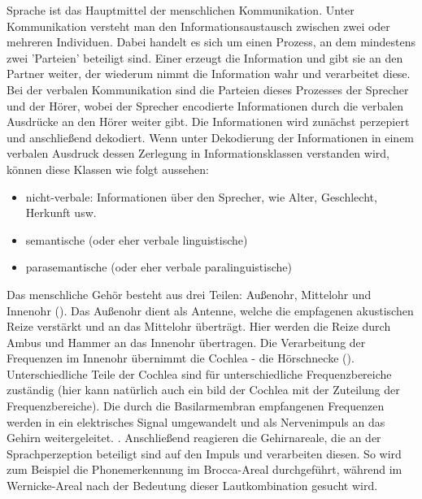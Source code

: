 \documentclass[11pt,a4paper,headsepline,twoside,toc=bibliography]{scrreprt}
\begin{document}
Sprache ist das Hauptmittel der menschlichen Kommunikation. Unter Kommunikation versteht man den Informationsaustausch zwischen zwei oder mehreren Individuen. Dabei handelt es sich um einen Prozess, an dem mindestens zwei 'Parteien' beteiligt sind. Einer erzeugt die Information und gibt sie an den Partner weiter, der wiederum nimmt die Information wahr und verarbeitet diese. Bei der verbalen Kommunikation sind die Parteien dieses Prozesses der Sprecher und der Hörer, wobei der Sprecher encodierte Informationen durch die verbalen Ausdrücke an den Hörer weiter gibt. Die Informationen wird zunächst perzepiert und anschließend dekodiert. Wenn unter Dekodierung der Informationen in einem verbalen Ausdruck dessen Zerlegung in Informationsklassen verstanden wird, können diese Klassen wie folgt aussehen:

\begin{itemize}
	\item nicht-verbale: Informationen über den Sprecher, wie Alter, Geschlecht, Herkunft usw.
	\item semantische (oder eher verbale linguistische)
	\item parasemantische (oder eher verbale paralinguistische)
\end{itemize}

Das menschliche Gehör besteht aus drei Teilen: Außenohr, Mittelohr und Innenohr (). Das Außenohr dient als Antenne, welche die empfagenen akustischen Reize verstärkt und an das Mittelohr überträgt. Hier werden die Reize durch Ambus und Hammer an das Innenohr übertragen. Die Verarbeitung der Frequenzen im Innenohr übernimmt die Cochlea - die Hörschnecke ().  Unterschiedliche Teile der Cochlea sind für unterschiedliche Frequenzbereiche zuständig (hier kann natürlich auch ein bild der Cochlea mit der Zuteilung der Frequenzbereiche). Die durch die Basilarmembran empfangenen Frequenzen werden in ein elektrisches Signal umgewandelt und als Nervenimpuls an das Gehirn weitergeleitet. . Anschließend reagieren die Gehirnareale, die an der Sprachperzeption beteiligt sind auf den Impuls und verarbeiten diesen. So wird zum Beispiel die Phonemerkennung im Brocca-Areal durchgeführt, während im Wernicke-Areal nach der Bedeutung dieser Lautkombination gesucht wird. \\
\end{document}
